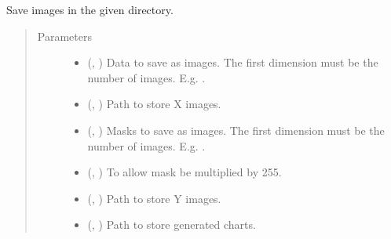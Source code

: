 \documentclass[letterpaper,10pt,english]{sphinxmanual}
\begin{document}
\begin{fulllineitems}
\label{\detokenize{utils/util:utils.util.save_img}}
Save images in the given directory.
\begin{quote}\begin{description}
\item[{Parameters}] \leavevmode\begin{itemize}
\item {} 
 (, ) \textendash{} Data to save as images. The first dimension must be the number of images. E.g. .

\item {} 
 (, ) \textendash{} Path to store X images.

\item {} 
 (, ) \textendash{} Masks to save as images. The first dimension must be the number of images. E.g. .

\item {} 
 (, ) \textendash{} To allow mask be multiplied by 255.

\item {} 
 (, ) \textendash{} Path to store Y images.

\item {} 
 (, ) \textendash{} Path to store generated charts.


\end{itemize}
\end{description}
\end{quote}
\end{fulllineitems}
\end{document}
